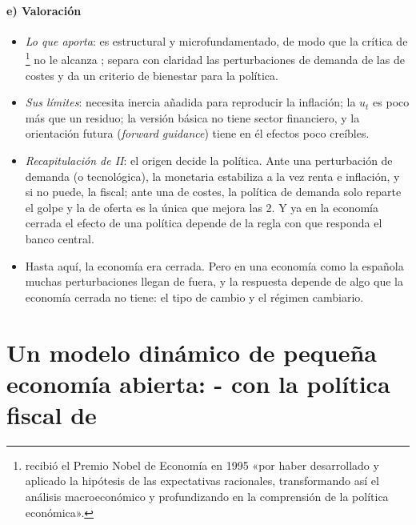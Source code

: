 \documentclass[11pt]{article}
\begin{document}
\paragraph{e) Valoración}

\begin{itemize}
\item \emph{Lo que aporta}: es estructural y microfundamentado, de modo que la crítica de \nocite{Lucas1976Econometric}\footnote{ recibió el Premio Nobel de Economía en 1995 «por haber desarrollado y aplicado la hipótesis de las expectativas racionales, transformando así el análisis macroeconómico y profundizando en la comprensión de la política económica»\nocite{Nobel1995Lucas}.} no le alcanza ; separa con claridad las perturbaciones de demanda de las de costes y da un criterio de bienestar para la política.
\item \emph{Sus límites}: necesita inercia añadida para reproducir la inflación; la $u_t$ es poco más que un residuo; la versión básica no tiene sector financiero, y la orientación futura (\emph{forward guidance}) tiene en él efectos poco creíbles.
\item \emph{Recapitulación de II}: el origen decide la política. Ante una perturbación de demanda (o tecnológica), la monetaria estabiliza a la vez renta e inflación, y si no puede, la fiscal; ante una de costes, la política de demanda solo reparte el golpe y la de oferta es la única que mejora las 2. Y ya en la economía cerrada el efecto de una política depende de la regla con que responda el banco central.
\item Hasta aquí, la economía era cerrada. Pero en una economía como la española muchas perturbaciones llegan de fuera, y la respuesta depende de algo que la economía cerrada no tiene: el tipo de cambio y el régimen cambiario.
\end{itemize}


\section{Un modelo dinámico de pequeña economía abierta:\cortetitulo{} - con la política fiscal de }\label{sec:abierta}
\end{document}
